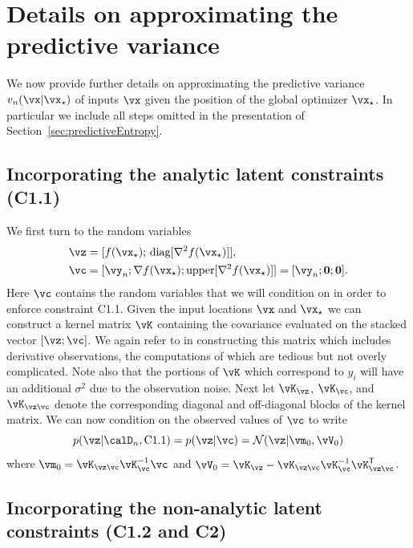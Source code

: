 \section{Details on approximating the predictive variance}
\label{sec:predictiveEntropyAppendix}

We now provide further details on approximating the predictive variance
$v_n(\x|\xopt)$ of inputs $\x$ given the position of the global optimizer
$\xopt$. In particular we include all steps omitted in the presentation of
Section~\ref{sec:predictiveEntropy}.

\subsection{Incorporating the analytic latent constraints (C1.1)}

We first turn to the random variables
\begin{align*}
    \vz &= [f(\xopt);\, \diag[\nabla^2f(\xopt)]], \\
    \vc &= [\vy_n; \nabla f(\xopt); \upper[\nabla^2 f(\xopt)]]
         = [\vy_n; \zero; \zero].
\end{align*}
Here $\vc$ contains the random variables that we will condition on in order to
enforce constraint C1.1. Given the input locations $\x$ and $\xopt$ we can
construct a kernel matrix $\vK$ containing the covariance evaluated on the
stacked vector $[\vz; \vc]$. We again refer to \cite{Solak:2003} in constructing
this matrix which includes derivative observations, the computations of which
are tedious but not overly complicated. Note also that the portions of $\vK$
which correspond to $y_i$ will have an additional $\sigma^2$ due to the
observation noise. Next let $\vK_\vz$, $\vK_\vc$, and $\vK_{\vz\vc}$ denote the
corresponding diagonal and off-diagonal blocks of the kernel matrix.
We can now condition on the observed values of $\vc$ to write
\begin{equation*}
    p(\vz|\D_n,\C{1.1})
    = p(\vz|\vc) = \Normal(\vz|\vm_0,\vV_0)
\end{equation*}
where $\vm_0=\vK_{\vz\vc} \vK^{-1}_\vc\vc$ and $\vV_0= \vK_\vz -
\vK_{\vz\vc}\vK^{-1}_\vc \vK_{\vz\vc}\T$.

\subsection{Incorporating the non-analytic latent constraints (C1.2 and C2)}

